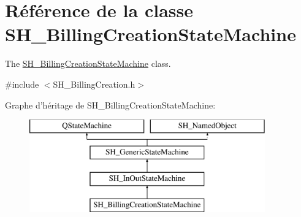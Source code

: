 \hypertarget{classSH__BillingCreationStateMachine}{\section{Référence de la classe S\-H\-\_\-\-Billing\-Creation\-State\-Machine}
\label{classSH__BillingCreationStateMachine}
}


The \hyperlink{classSH__BillingCreationStateMachine}{S\-H\-\_\-\-Billing\-Creation\-State\-Machine} class.  




{\ttfamily \#include $<$S\-H\-\_\-\-Billing\-Creation.\-h$>$}

Graphe d'héritage de S\-H\-\_\-\-Billing\-Creation\-State\-Machine\-:\begin{figure}[H]
\begin{center}
\leavevmode
\includegraphics[height=4.000000cm]{classSH__BillingCreationStateMachine}
\end{center}
\end{figure}
